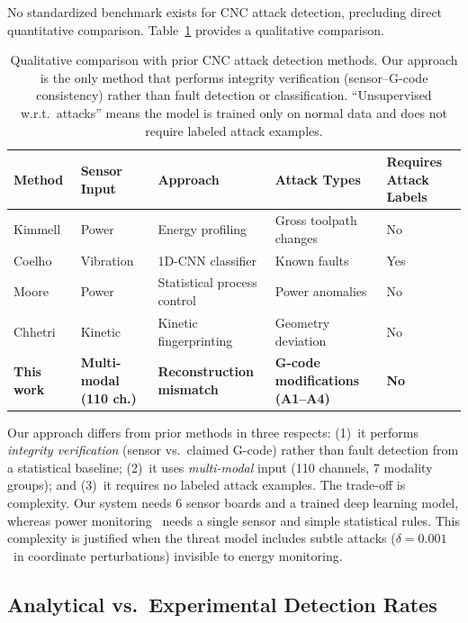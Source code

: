 No standardized benchmark exists for CNC attack detection, precluding direct quantitative comparison.
Table~\ref{tab:comparison} provides a qualitative comparison.

\begin{table}[t]
\centering
\caption{Qualitative comparison with prior CNC attack detection methods. Our approach is the only method that performs integrity verification (sensor--G-code consistency) rather than fault detection or classification. ``Unsupervised w.r.t.\ attacks'' means the model is trained only on normal data and does not require labeled attack examples.}
\label{tab:comparison}
\small
\begin{tabular}{@{}p{2.5cm}p{2cm}p{2.5cm}p{1.5cm}p{2cm}@{}}
\toprule
Method & Sensor Input & Approach & Attack Types & Requires Attack Labels \\
\midrule
Kimmell~\cite{kimmell2025} & Power & Energy profiling & Gross toolpath changes & No \\
Coelho~\cite{coelho2024} & Vibration & 1D-CNN classifier & Known faults & Yes \\
Moore~\cite{moore2017power} & Power & Statistical process control & Power anomalies & No \\
Chhetri~\cite{chhetri2016kcad} & Kinetic & Kinetic fingerprinting & Geometry deviation & No \\
\midrule
\textbf{This work} & \textbf{Multi-modal (110 ch.)} & \textbf{Reconstruction mismatch} & \textbf{G-code modifications (A1--A4)} & \textbf{No} \\
\bottomrule
\end{tabular}
\end{table}

Our approach differs from prior methods in three respects: (1)~it performs \emph{integrity verification} (sensor vs.\ claimed G-code) rather than fault detection from a statistical baseline; (2)~it uses \emph{multi-modal} input (110 channels, 7 modality groups); and (3)~it requires no labeled attack examples.
The trade-off is complexity.
Our system needs 6 sensor boards and a trained deep learning model, whereas power monitoring~\cite{kimmell2025,moore2017power} needs a single sensor and simple statistical rules.
This complexity is justified when the threat model includes subtle attacks ($\delta = 0.001$~in coordinate perturbations) invisible to energy monitoring.

\subsection{Analytical vs.\ Experimental Detection Rates}
\label{sec:disc_gap}

